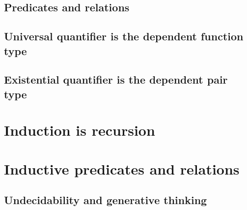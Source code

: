 \documentclass{beamer}
\begin{document}
\subsection{Predicates and relations}

\subsection{Universal quantifier is the dependent function type}
\subsection{Existential quantifier is the dependent pair type}


\section{Induction is recursion}


\section{Inductive predicates and relations}

\subsection{Undecidability and generative thinking}
\end{document}
